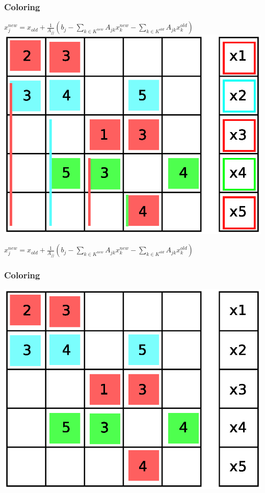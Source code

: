 \documentclass{beamer}
\begin{document}
\begin{frame}
\frametitle{Coloring}
$ x_j^{new} = x_{old} + \frac{1}{A_{jj}} \left(b_{j} - \sum_{k \in K^{new}}A_{jk}
 x_k^{new} - \sum_{k \in K^{old}}A_{jk} x_k^{old}\right)$
\includegraphics[width=0.8\linewidth]{graphic/coloringGS10.eps}
\end{frame}

\begin{frame}
$ x_j^{new} = x_{old} + \frac{1}{A_{jj}} \left(b_{j} - \sum_{k \in K^{new}}A_{jk}
 x_k^{new} - \sum_{k \in K^{old}}A_{jk} x_k^{old}\right)$
\frametitle{Coloring}
\includegraphics[width=0.8\linewidth]{graphic/coloringGS11.eps}
\end{frame}
\end{document}
